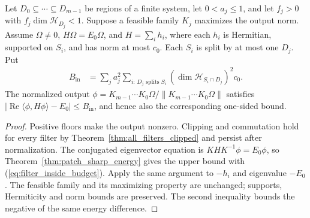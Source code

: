 \begin{theorem}
    \label{thm:filter_max_sharp_energy}
    \leanok
    Let $D_0\subseteq\cdots\subseteq D_{m-1}$ be regions of a finite
    system, let $0<a_j\le1$, and let $f_j>0$ with
    $f_j\dim\mathcal H_{D_j}<1$. Suppose a feasible family $K_j$
    maximizes the output norm. Assume $\Omega\ne0$,
    $H\Omega=E_0\Omega$, and $H=\sum_i h_i$, where each $h_i$ is
    Hermitian, supported on $S_i$, and has norm at most $c_0$.
    Each $S_i$ is split by at most one $D_j$. Put
    \begin{align}
        B_{\mathrm{in}}
         & =\sum_j a_j^2\sum_{i:\,D_j\text{ splits }S_i}
        (\dim\mathcal H_{S_i\cap D_j})^2c_0.
        \label{eq:filter_inside_budget}
    \end{align}
    The normalized output $\phi=K_{m-1}\cdots K_0\Omega/
        \lVert K_{m-1}\cdots K_0\Omega\rVert$ satisfies
    $|\operatorname{Re}\langle\phi,H\phi\rangle-E_0|
        \le B_{\mathrm{in}}$, and hence also the corresponding one-sided bound.
\end{theorem}
\begin{proof}\leanok
    Positive floors make the output nonzero. Clipping and commutation
    hold for every filter by Theorem~\ref{thm:all_filters_clipped} and
    persist after normalization. The conjugated eigenvector equation is
    $KHK^{-1}\phi=E_0\phi$, so Theorem~\ref{thm:patch_sharp_energy}
    gives the upper bound with (\ref{eq:filter_inside_budget}).
    Apply the same argument to $-h_i$ and eigenvalue $-E_0$.
    The feasible family and its maximizing property are unchanged;
    supports, Hermiticity and norm bounds are preserved. The second
    inequality bounds the negative of the same energy difference.
\end{proof}

